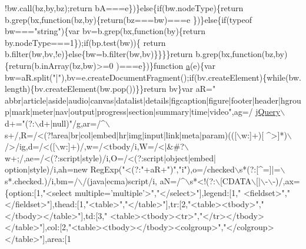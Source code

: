 \begin{DoxyCode}
{      !bw.call(bz,by,bz);\textcolor{keywordflow}{return} bA===e\})\}\textcolor{keywordflow}{else}\{\textcolor{keywordflow}{if}(bw.nodeType)\{\textcolor{keywordflow}{return} b.grep(bx,\textcolor{keyword}{function}(bz,by)\{\textcolor{keywordflow}{return}(bz===bw)===e
      \})\}\textcolor{keywordflow}{else}\{\textcolor{keywordflow}{if}(typeof bw===\textcolor{stringliteral}{"string"})\{var bv=b.grep(bx,\textcolor{keyword}{function}(by)\{\textcolor{keywordflow}{return} by.nodeType===1\});\textcolor{keywordflow}{if}(bp.test(bw))\{\textcolor{keywordflow}{
      return} b.filter(bw,bv,!e)\}\textcolor{keywordflow}{else}\{bw=b.filter(bw,bv)\}\}\}\}\textcolor{keywordflow}{return} b.grep(bx,\textcolor{keyword}{function}(bz,by)\{\textcolor{keywordflow}{return}(b.inArray(bz,bw)>=0
      )===e\})\}\textcolor{keyword}{function} \hyperlink{jquery_8js_aa4d4888597588a84fd5b1184d00c91f3}{a}(e)\{var bw=aR.split(\textcolor{stringliteral}{"|"}),bv=e.createDocumentFragment();\textcolor{keywordflow}{if}(bv.createElement)\{\textcolor{keywordflow}{while}(bw.
      length)\{bv.createElement(bw.pop())\}\}\textcolor{keywordflow}{return} bv\}var aR=\textcolor{stringliteral}{"
      abbr|article|aside|audio|canvas|datalist|details|figcaption|figure|footer|header|hgroup|mark|meter|nav|output|progress|section|summary|time|video"},ag=/ 
      \hyperlink{jquery_8js_aa676d9980e4aff2d9210b4c8e0e1dad9}{jQuery}\(\backslash\)d+=\textcolor{stringliteral}{"(?:\(\backslash\)d+|null)"}/g,ar=/^\(\backslash\)s+/,R=/<(?!area|br|col|embed|hr|img|input|link|meta|param)(([\(\backslash\)w:]+)[
      ^>]*)\(\backslash\)/>/ig,d=/<([\(\backslash\)w:]+)/,w=/<tbody/i,W=/<|&#?\(\backslash\)w+;/,ae=/<(?:script|style)/i,O=/<(?:script|\textcolor{keywordtype}{object}|embed|
      option|style)/i,ah=\textcolor{keyword}{new} RegExp(\textcolor{stringliteral}{"<(?:"}+aR+\textcolor{stringliteral}{")"},\textcolor{stringliteral}{"i"}),o=/checked\(\backslash\)s*(?:[^=]|=\(\backslash\)s*.checked.)/i,bm=/\(\backslash\)/(java|ecma)script/i,
      aN=/^\(\backslash\)s*<!(?:\(\backslash\)[CDATA\(\backslash\)[|\(\backslash\)-\(\backslash\)-)/,ax=\{option:[1,\textcolor{stringliteral}{"<select multiple='multiple'>"},\textcolor{stringliteral}{"</select>"}],legend:[1,\textcolor{stringliteral}{"
      <fieldset>"},\textcolor{stringliteral}{"</fieldset>"}],thead:[1,\textcolor{stringliteral}{"<table>"},\textcolor{stringliteral}{"</table>"}],tr:[2,\textcolor{stringliteral}{"<table><tbody>"},\textcolor{stringliteral}{"</tbody></table>"}],td:[3,\textcolor{stringliteral}{"
      <table><tbody><tr>"},\textcolor{stringliteral}{"</tr></tbody></table>"}],col:[2,\textcolor{stringliteral}{"<table><tbody></tbody><colgroup>"},\textcolor{stringliteral}{"</colgroup></table>"}],area:[1
}
\end{DoxyCode}
